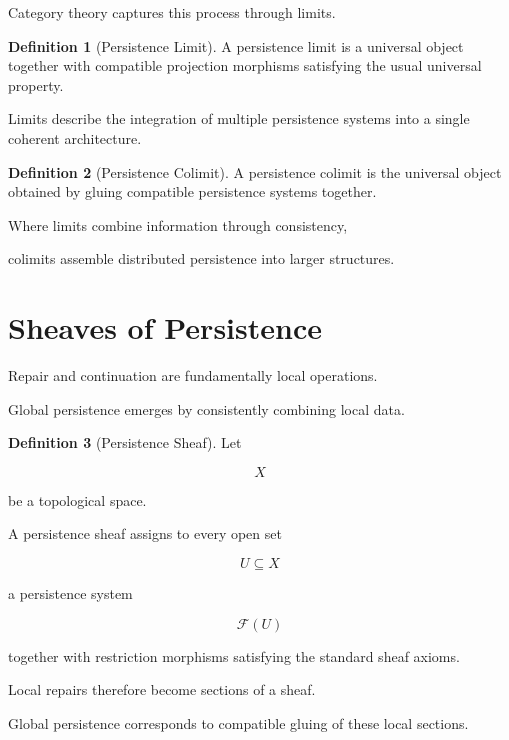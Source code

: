 \documentclass[11pt]{book}
\numberwithin{equation}{chapter}
\theoremstyle{definition}
\newtheorem{definition}{Definition}[chapter]
\theoremstyle{plain}
\begin{document}
Category theory captures this process through limits.

\begin{definition}[Persistence Limit]

A persistence limit is a universal object together with compatible
projection morphisms satisfying the usual universal property.

\end{definition}

Limits describe the integration of multiple persistence systems into a
single coherent architecture.

\begin{definition}[Persistence Colimit]

A persistence colimit is the universal object obtained by gluing
compatible persistence systems together.

\end{definition}

Where limits combine information through consistency,

colimits assemble distributed persistence into larger structures.

\section{Sheaves of Persistence}

Repair and continuation are fundamentally local operations.

Global persistence emerges by consistently combining local data.

\begin{definition}[Persistence Sheaf]

Let

\[
X
\]

be a topological space.

A persistence sheaf assigns to every open set

\[
U
\subseteq
X
\]

a persistence system

\[
\mathcal F(U)
\]

together with restriction morphisms satisfying the standard sheaf
axioms.

\end{definition}

Local repairs therefore become sections of a sheaf.

Global persistence corresponds to compatible gluing of these local
sections.
\end{document}
